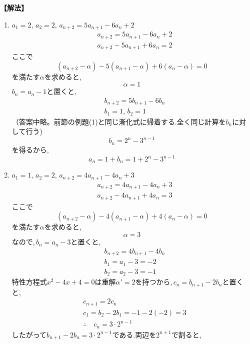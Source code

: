     \noindent\textbf{【解法】}
    \begin{enumerate}[label=(\arabic*),parsep=3pt]
      \item $\displaystyle a_1=2,\,a_2=2,\, a_{n+2}=5a_{n+1}-6a_n+2$
            \begin{align*}
              &a_{n+2}=5a_{n+1}-6a_n+2\\
              &a_{n+2}-5a_{n+1}+6a_n=2
            \end{align*}
            ここで
            \[
              (a_{n+2}-\alpha)-5(a_{n+1}-\alpha)+6(a_n-\alpha)=0 
            \]
            を満たす$\alpha$を求めると,
            \[
              \alpha=1
            \]
            $b_n=a_n-1$と置くと,
            \begin{align*}
              &b_{n+2}=5b_{n+1}-6b_n\\
              &b_1=1,\, b_2=1
            \end{align*}
            （答案中略。前節の例題(1)と同じ漸化式に帰着する.全く同じ計算を$b_n$に対して行う)
            \[
              b_n=2^n-3^{n-1}
            \]
            を得るから,
            \[
              a_n=1+b_n=1+2^n-3^{n-1}
            \]
      \item $\displaystyle a_1=1,\,a_2=2,\, a_{n+2}=4a_{n+1}-4a_n+3$
            \begin{align*}
              &a_{n+2}=4a_{n+1}-4a_n+3\\
              &a_{n+2}-4a_{n+1}+4a_n=3
            \end{align*}
            ここで
            \[
              (a_{n+2}-\alpha)-4(a_{n+1}-\alpha)+4(a_n-\alpha)=0 
            \]
            を満たす$\alpha$を求めると,
            \[
              \alpha=3
            \]
            なので,\,$b_n=a_n-3$と置くと,
            \begin{align*}
              &b_{n+2}=4b_{n+1}-4b_n\\
              &b_1=a_1-3=-2\\
              &b_2=a_2-3=-1                
            \end{align*}
            特性方程式$x^2-4x+4=0$は重解$\alpha'=2$を持つから,\,$c_n=b_{n+1}-2b_n$と置くと,
            \begin{align*}
              &c_{n+1}=2c_n\\
              &c_1=b_2-2b_1=-1-2(-2)=3\\
              &\therefore \quad c_n=3\cdot2^{n-1}
            \end{align*}
            したがって$b_{n+1}-2b_n=3\cdot2^{n-1}$である.両辺を$2^{n+1}$で割ると,

\end{enumerate}
